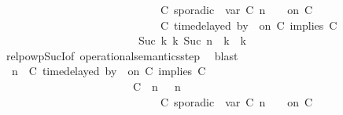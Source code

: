 \begin{isabellebody}
\ \ \ \ \ \ \ \ \ \ \ \ \ \ \ \ \ \ \ \ \ \ \ \ \ \ \ \ {\isasymturnstile}\ {\isacharparenleft}C\ sporadic{\isasymsharp}\ {\isasymlparr}\ {\isasymtau}\isactrlsub v\isactrlsub a\isactrlsub r\ {\isacharparenleft}C\ n{\isacharparenright}\ {\isasymoplus}\ {\isasymdelta}{\isasymtau}\ {\isasymrparr}\ on\ C\ {\isacharhash}\ {\isasymPsi}\isanewline
\ \ \ \ \ \ \ \ \ \ \ \ \ \ \ \ \ \ \ \ \ \ \ \ \ \ \ \ {\isasymtriangleright}\ {\isacharparenleft}{\isacharparenleft}C\ time{\isacharminus}delayed{\isasymbowtie}\ by\ {\isasymdelta}{\isasymtau}\ on\ C\ implies\ C\ {\isacharhash}\ {\isasymPhi}{\isacharparenright}{\isacharparenright}\isanewline
\ \ \ \ \ \ \ \ \ \ \ \ \ \ \ \ \ \ \ \ \ \ \ \ \ {\isasymhookrightarrow}\isactrlbsup Suc\ k\isactrlesup \ {\isacharparenleft}{\isasymGamma}\isactrlsub k{\isacharcomma}\ Suc\ n\ {\isasymturnstile}\ {\isasymPsi}\isactrlsub k\ {\isasymtriangleright}\ {\isasymPhi}\isactrlsub k{\isacharparenright}{\isacartoucheclose}\isanewline
\ \ \ \ \ \ \ \ \ \ \ \ \isamarkupfalse%
\ relpowp{\isacharunderscore}Suc{\isacharunderscore}I{}{\isacharbrackleft}of\ {\isacartoucheopen}operational{\isacharunderscore}semantics{\isacharunderscore}step{\isacartoucheclose}{\isacharbrackright}\ \isamarkupfalse%
\ blast\isanewline
\ \ \ \ \ \ \ \ \ \ \isamarkupfalse%
\ \isamarkupfalse%
\ {\isacartoucheopen}{\isacharparenleft}{\isasymGamma}{\isacharcomma}\ n\ {\isasymturnstile}\ {\isacharparenleft}{\isacharparenleft}C\ time{\isacharminus}delayed{\isasymbowtie}\ by\ {\isasymdelta}{\isasymtau}\ on\ C\ implies\ C\ {\isacharhash}\ {\isasymPsi}{\isacharparenright}\ {\isasymtriangleright}\ {\isasymPhi}{\isacharparenright}\isanewline
\ \ \ \ \ \ \ \ \ \ \ \ \ \ \ \ \ \ \ \ \ \ {\isasymhookrightarrow}\ {\isacharparenleft}\ {\isacharparenleft}{\isacharparenleft}C\ {\isasymUp}\ n{\isacharparenright}\ {\isacharhash}\ {\isasymGamma}{\isacharparenright}{\isacharcomma}\ n\isanewline
\ \ \ \ \ \ \ \ \ \ \ \ \ \ \ \ \ \ \ \ \ \ \ \ \ \ \ \ {\isasymturnstile}\ {\isacharparenleft}C\ sporadic{\isasymsharp}\ {\isasymlparr}\ {\isasymtau}\isactrlsub v\isactrlsub a\isactrlsub r\ {\isacharparenleft}C\ n{\isacharparenright}\ {\isasymoplus}\ {\isasymdelta}{\isasymtau}\ {\isasymrparr}\ on\ C\ {\isacharhash}\ {\isasymPsi}\isanewline

\end{isabellebody}

